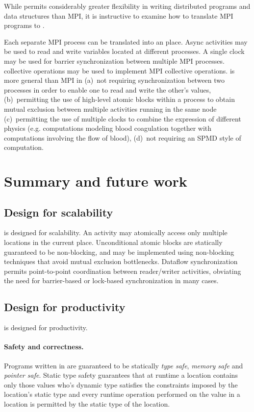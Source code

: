 While \Xten{} permits considerably greater flexibility in writing
distributed programs and data structures than MPI, it is instructive
to examine how to translate MPI programs to \Xten.

Each separate MPI process can be translated into an \Xten{}
place. Async activities may be used to read and write variables
located at different processes. A single clock may be used for barrier
synchronization between multiple MPI processes. \Xten{} collective
operations may be used to implement MPI collective operations.
\Xten{} is more general than MPI in (a)~not requiring synchronization
between two processes in order to enable one to read and write the
other's values, (b)~permitting the use of high-level atomic blocks
within a process to obtain mutual exclusion between multiple
activities running in the same node (c)~permitting the use of multiple
clocks to combine the expression of different physics (e.g.{}
computations modeling blood coagulation together with computations
involving the flow of blood), (d)~not requiring an SPMD style of
computation.


\section{Summary and future work}
\subsection{Design for scalability}
\Xten{} is designed for scalability. An activity may atomically
access only multiple locations in the current place. Unconditional
atomic blocks are statically guaranteed to be non-blocking, and may
be implemented using non-blocking techniques that avoid mutual
exclusion bottlenecks. Dataflow synchronization permits point-to-point
coordination between reader/writer activities, obviating the need for
barrier-based or lock-based synchronization in many cases.

\subsection{Design for productivity}
\Xten{} is designed for productivity. 

\paragraph{Safety and correctness.} 
Programs written in \Xten{} are guaranteed to be statically
\emph{type
safe}, \emph{memory safe} and \emph{pointer safe}. Static type safety
guarantees that at runtime a location contains only those values who's
dynamic type satisfies the constraints imposed by the location's
static type and every runtime operation performed on the value in a
location is permitted by the static type of the location.

